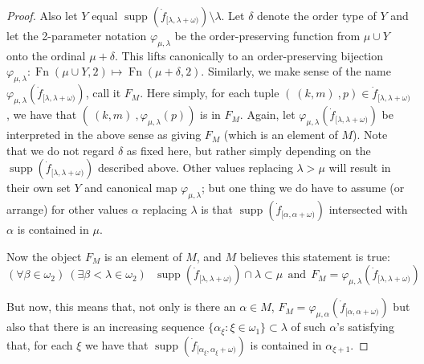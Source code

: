 \documentclass{amsart}
\theoremstyle{plain}
\theoremstyle{definition}
\theoremstyle{remark}
\theoremstyle{plain}
\theoremstyle{definition}
\theoremstyle{remark}
\begin{document}
\begin{proof}
             Also let $Y$ equal $\operatorname{supp}(\dot
             f_{[\lambda,\lambda+\omega)})\setminus \lambda$.
             Let $\delta$ denote the order type of
             $Y$ and let the 2-parameter notation
             $\varphi_{\mu,\lambda}$ be the order-preserving function from
            $\mu\cup Y$ onto  the ordinal $\mu+\delta$.  This lifts canonically to
            an order-preserving bijection $\varphi_{\mu,\lambda}:
            \operatorname{Fn}(\mu\cup Y,2) \mapsto
            \operatorname{Fn}(\mu+\delta,2)$.
            Similarly, we make sense of the name
             $\varphi_{\mu,\lambda}(\dot f_{[\lambda,\lambda+\omega)})$, call it $F_M$.
            Here simply, for each tuple $(~(k,m)~, p)\in \dot
            f_{[\lambda,\lambda+\omega)}$,
             we have that $(~(k,m)~,\varphi_{\mu,\lambda}(p))$ is in $F_M$.
            Again, let $\varphi_{\mu,\lambda}(\dot f_{[\lambda,\lambda+\omega)})$
            be interpreted in the above sense as giving $F_M$ (which is an element
            of $M$).  Note that we do not regard $\delta$ as fixed here, but
            rather simply depending on the $\operatorname{supp}(\dot
            f_{[\lambda,\lambda+\omega)})$ described above. Other values
            replacing $\lambda>\mu$ will result in their own set $Y$
            and canonical map $\varphi_{\mu,\lambda}$; but one thing we do have to
            assume (or arrange) for other values $\alpha$ replacing $\lambda$
            is that $\operatorname{supp}(\dot f_{[\alpha,\alpha+\omega)})$
            intersected with
            $\alpha$ is contained in $\mu$.

            Now the object $F_M$ is an
            element of $M$, and $M$ believes this statement is true:
            $$
            (\forall \beta\in\omega_2)~ (\exists \beta<\lambda\in \omega_2)~~~
            \operatorname{supp}(\dot f_{[\lambda,\lambda+\omega)})
            \cap \lambda\subset \mu \ \ \mbox{and}\ \
            F_M = \varphi_{\mu,\lambda}(\dot f_{[\lambda,\lambda+\omega)})$$


            But now, this  means that,
            not only is there  an $\alpha\in M$,
            $ F_M = \varphi_{\mu,\alpha}(\dot f_{[\alpha,\alpha+\omega)})$
            but also that there is an increasing sequence
             $\{\alpha_\xi : \xi  \in \omega_1\}\subset \lambda$ of
             such $\alpha$'s satisfying that, for each $\xi$
            we have that $\operatorname{supp}(\dot
            f_{[\alpha_\xi,\alpha_\xi+\omega)})$ is contained in $\alpha_{\xi+1}$.


\end{proof}
\end{document}
